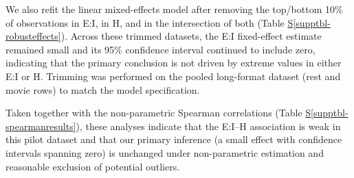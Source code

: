 \documentclass[
true
]{sn-jnl}
\newcounter{none} %
\newcommand*\quartosupptblref[1]{Table \hyperref[#1]{S\ref{#1}}}
\begin{document}
\begin{supptbl}


\caption{\label{supptbl-spearmanresults}Spearman correlation between EI
and Hurst by condition.}

\end{supptbl}%

We also refit the linear mixed-effects model after removing the
top/bottom 10\% of observations in E:I, in H, and in the intersection of
both (\quartosupptblref{supptbl-robusteffects}). Across these trimmed
datasets, the E:I fixed-effect estimate remained small and its 95\%
confidence interval continued to include zero, indicating that the
primary conclusion is not driven by extreme values in either E:I or H.
Trimming was performed on the pooled long-format dataset (rest and movie
rows) to match the model specification.

Taken together with the non-parametric Spearman correlations
(\quartosupptblref{supptbl-spearmanresults}), these analyses indicate
that the E:I--H association is weak in this pilot dataset and that our
primary inference (a small effect with confidence intervals spanning
zero) is unchanged under non-parametric estimation and reasonable
exclusion of potential outliers.

\begin{supptbl}


\caption{\label{supptbl-robusteffects}EI fixed-effect estimates
(Estimate ± 95\% CI) for the full sample and each trimmed sample.}

\end{supptbl}%
\end{document}
